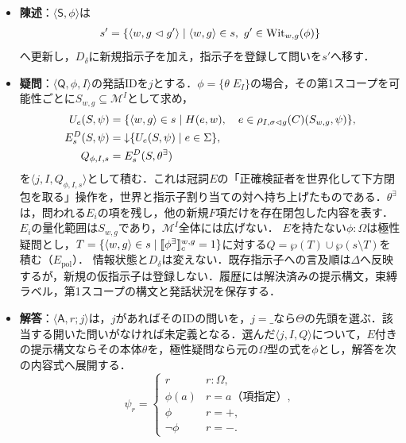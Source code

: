 \documentclass[../../main-detail.tex]{subfiles}
\begin{document}
\begin{definition}[発話の更新]
    \leavevmode
    \begin{itemize}
        \item \textbf{陳述}：$\langle\mathsf S,\phi\rangle$は
        \[
            s'=\{\langle w,g\vartriangleleft g'\rangle\mid\langle w,g\rangle\in s,
                           \ g'\in\mathrm{Wit}_{w,g}(\phi)\}
        \]
        へ更新し，$D_\delta$に新規指示子を加え，指示子を登録して問いを$s'$へ移す．
        \item \textbf{疑問}：$\langle\mathsf Q,\phi,I\rangle$の発話IDを$j$とする．$\phi=\{\theta\;E_I\}$の場合，その第1スコープを可能性ごとに$S_{w,g}\subseteq\mathcal M^I$として求め，
        \[
        \begin{split}
            U_e(S,\psi)&=\{\langle w,g\rangle\in s\mid H(e,w),\quad
                  e\in\rho_{I,\sigma\vartriangleleft g}(C)(S_{w,g},\psi)\},\\
            E^D_s(S,\psi)&={\downarrow}\{U_e(S,\psi)\mid e\in\Sigma\},\\
            Q_{\phi,I,s}&=E^D_s(S,\theta^\exists)
        \end{split}
        \]
        を$\langle j,I,Q_{\phi,I,s}\rangle$として積む．これは冠詞$E$の「正確検証者を世界化して下方閉包を取る」操作を，世界と指示子割り当ての対へ持ち上げたものである．$\theta^\exists$は，問われる$E_i$の項を残し，他の新規$F$項だけを存在閉包した内容を表す．$E_i$の量化範囲は$S_{w,g}$であり，$\mathcal M^I$全体には広げない．
        $E$を持たない$\phi:\Omega$は極性疑問とし，$T=\{\langle w,g\rangle\in s\mid\llbracket\phi^\exists\rrbracket_c^{w,g}=1\}$に対する$Q=\wp(T)\cup\wp(s\setminus T)$を積む（$E_{\mathrm{pol}}$）．
        情報状態と$D_\delta$は変えない．既存指示子への言及順は$\Delta$へ反映するが，新規の仮指示子は登録しない．履歴には解決済みの提示構文，束縛ラベル，第1スコープの構文と発話状況を保存する．
        \item \textbf{解答}：$\langle\mathsf A,r;j\rangle$は，$j$があればそのIDの問いを，$j=\_$なら$\Theta$の先頭を選ぶ．該当する開いた問いがなければ未定義となる．選んだ$\langle j,I,Q\rangle$について，$E$付きの提示構文ならその本体$\theta$を，極性疑問なら元の$\Omega$型の式を$\phi$とし，解答を次の内容式へ展開する．
        \[
            \psi_r=\begin{cases}
                r & r:\Omega,\\
                \phi(a) & r=a\text{（項指定）},\\
                \phi & r=+,\\
                \lnot\phi & r=-.
            \end{cases}
\]
\end{itemize}
\end{definition}
\end{document}
